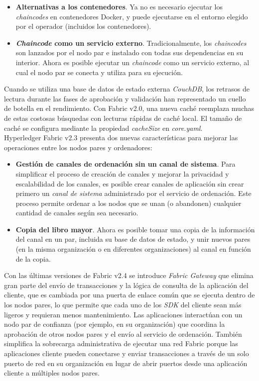 {\begin{itemize}
\item {\bf Alternativas a los contenedores}. Ya no es necesario ejecutar los \emph{chaincodes} en contenedores Docker, y puede ejecutarse en el entorno elegido por el operador (incluidos los contenedores).


\item {\bf \emph{Chaincode} como un servicio externo}. Tradicionalmente, los \emph{chaincodes} son lanzados por el nodo par e instalado con todas sus dependencias en su interior. Ahora es posible ejecutar un \emph{chaincode} como un servicio externo, al cual el nodo par se conecta y utiliza para su ejecuci\'on.
\end{itemize}

Cuando se utiliza una base de datos de estado externa \emph{CouchDB}, los retrasos de lectura durante las fases de aprobaci\'on y validaci\'on han representado un cuello de botella en el rendimiento. Con Fabric v2.0, una nueva cach\'e reemplaza muchas de estas costosas b\'usquedas con lecturas r\'apidas de cach\'e local. El tama\~no de cach\'e se configura mediante la propiedad \emph{cacheSize} en \emph{core.yaml}.\\

Hyperledger Fabric v2.3 presenta dos nuevas caracter\'isticas para mejorar las operaciones entre los nodos pares y ordenadores:

\begin{itemize}
\item {\bf Gesti\'on de canales de ordenaci\'on sin un canal de sistema}. Para simplificar el proceso de creaci\'on de canales y mejorar la privacidad y escalabilidad de los canales, es posible crear canales de aplicaci\'on sin crear primero un \emph{canal de sistema} administrado por el servicio de ordenaci\'on. Este proceso permite ordenar a los nodos que se unan (o abandonen) cualquier cantidad de canales seg\'un sea necesario.

\item {\bf Copia del libro mayor}. Ahora es posible tomar una copia de la informaci\'on del canal en un par, incluida su base de datos de estado, y unir nuevos pares (en la misma organizaci\'on o en diferentes organizaciones) al canal en funci\'on de la copia.
\end{itemize}

Con las \'ultimas versiones de Fabric v2.4 se introduce \emph{Fabric Gateway} que elimina gran parte del env\'io de transacciones y la l\'ogica de consulta de la aplicaci\'on del cliente, que es cambiada por una puerta de enlace com\'un que se ejecuta dentro de los nodos pares, lo que permite que cada uno de los \emph{SDK} del cliente sean m\'as ligeros y requieran menos mantenimiento. Las aplicaciones interact\'uan con un nodo par de confianza (por ejemplo, en su organizaci\'on) que coordina la aprobaci\'on de otros nodos pares y el env\'io al servicio de ordenaci\'on. Tambi\'en simplifica la sobrecarga administrativa de ejecutar una red Fabric porque las aplicaciones cliente pueden conectarse y enviar transacciones a trav\'es de un solo puerto de red en su organizaci\'on en lugar de abrir puertos desde una aplicaci\'on cliente a m\'ultiples nodos pares.\\

}
